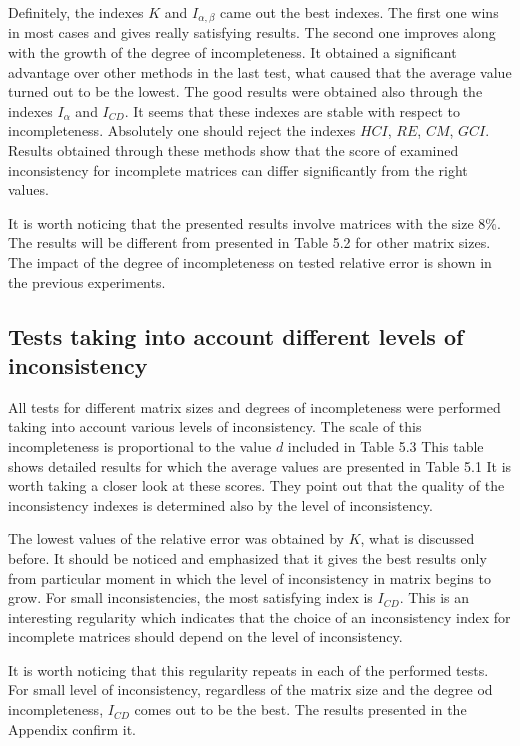 Definitely, the indexes $\textit{K}$ and $I_{\alpha,\beta}$ came out the best indexes. The first one wins in most cases and gives really satisfying results. The second one improves along with the growth of the degree of incompleteness. It obtained a significant advantage over other methods in the last test, what caused that the average value turned out to be the lowest. 
The good results were obtained also through the indexes $I_{\alpha}$ and $I_{CD}$. It seems that these indexes are stable with respect to incompleteness. Absolutely one should reject the indexes $\textit{HCI}$, $\textit{RE}$, $\textit{CM}$, $	\textit{GCI}$. Results obtained through these methods show that the score of examined inconsistency for incomplete matrices can differ significantly from the right values.

It is worth noticing that the presented results involve matrices with the size $8\%$. The results will be different from presented in Table 5.2 for other matrix sizes. The impact of the degree of incompleteness on tested relative error is shown in the previous experiments.

\subsection{Tests taking into account different levels of inconsistency}
All tests for different matrix sizes and degrees of incompleteness were performed taking into account various levels of inconsistency. The scale of this incompleteness is proportional to the value $d$ included in Table 5.3 This table shows detailed results for which the average values are presented in Table 5.1 It is worth taking a closer look at these scores. They point out that the quality of the inconsistency indexes is determined also by the level of inconsistency.

The lowest values of the relative error was obtained by $K$, what is discussed before. It should be noticed and emphasized that it gives the best results only from particular moment in which the level of inconsistency in matrix begins to grow. For small inconsistencies, the most satisfying index is $I_{CD}$. This is an interesting regularity which indicates that the choice of an inconsistency index for incomplete matrices should depend on the level of inconsistency. 

It is worth noticing that this regularity repeats in each of the performed tests. For small level of inconsistency, regardless of the matrix size and the degree od incompleteness, $I_{CD}$ comes out to be the best. The results presented in the Appendix confirm it.

